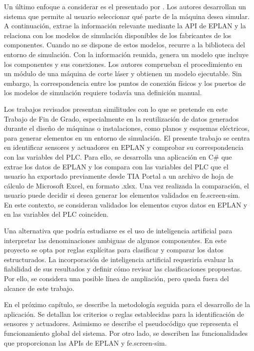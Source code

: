 Un último enfoque a considerar es el presentado por . Los autores desarrollan un sistema que permite al usuario seleccionar qué parte de la máquina desea simular. A continuación, extrae la información relevante mediante la API de EPLAN y la relaciona con los modelos de simulación disponibles de los fabricantes de los componentes. Cuando no se dispone de estos modelos, recurre a la biblioteca del entorno de simulación. Con la información reunida, genera un modelo que incluye los componentes y sus conexiones. Los autores comprueban el procedimiento en un módulo de una máquina de corte láser y obtienen un modelo ejecutable. Sin embargo, la correspondencia entre los puntos de conexión físicos y los puertos de los modelos de simulación requiere todavía una definición manual.


Los trabajos revisados presentan similitudes con lo que se pretende en este Trabajo de Fin de Grado, especialmente en la reutilización de datos generados durante el diseño de máquinas o instalaciones, como planos y esquemas eléctricos, para generar elementos en un entorno de simulación. El presente trabajo se centra en identificar sensores y actuadores en EPLAN y comprobar su correspondencia con las variables del PLC. Para ello, se desarrolla una aplicación en C\# que extrae los datos de EPLAN y los compara con las variables del PLC que el usuario ha exportado previamente desde TIA Portal a un archivo de hoja de cálculo de Microsoft Excel, en formato .xlsx. Una vez realizada la comparación, el usuario puede decidir si desea generar los elementos validados en fe.screen-sim. En este contexto, se consideran validados los elementos cuyos datos en EPLAN y en las variables del PLC coinciden.


Una alternativa que podría estudiarse es el uso de inteligencia artificial para interpretar las denominaciones ambiguas de algunos componentes. En este proyecto se opta por reglas explícitas para clasificar y comparar los datos estructurados. La incorporación de inteligencia artificial requeriría evaluar la fiabilidad de sus resultados y definir cómo revisar las clasificaciones propuestas. Por ello, se considera una posible línea de ampliación, pero queda fuera del alcance de este trabajo.


En el próximo capítulo, se describe la metodología seguida para el desarrollo de la aplicación. Se detallan los criterios o reglas establecidas para la identificación de sensores y actuadores. Asimismo se describe el pseudocódigo que representa el funcionamiento global del sistema. Por otro lado, se describen las funcionalidades que proporcionan las APIs de EPLAN y fe.screen-sim.








